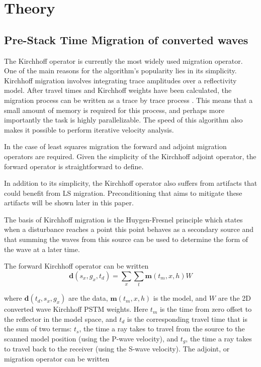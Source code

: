 \section{Theory}

\subsection{Pre-Stack Time Migration of converted waves}

The Kirchhoff operator is currently the most widely used migration operator. One of the main reasons for the algorithm's popularity lies in its simplicity. Kirchhoff migration involves integrating trace amplitudes over a reflectivity model. After travel times and Kirchhoff weights have been calculated, the migration process can be written as a trace by trace process \citep{sep80}. This means that a small amount of memory is required for this process, and perhaps more importantly the task is highly parallelizable. The speed of this algorithm also makes it possible to perform iterative velocity analysis.

In the case of least squares migration the forward and adjoint migration operators are required. Given the simplicity of the Kirchhoff adjoint operator, the forward operator is straightforward to define. 

In addition to its simplicity, the Kirchhoff operator also suffers from artifacts that could benefit from LS migration. Preconditioning that aims to mitigate these artifacts will be shown later in this paper.

The basis of Kirchhoff migration is the Huygen-Fresnel principle which states when a disturbance reaches a point this point behaves as a secondary source and that summing the waves from this source can be used to determine the form of the wave at a later time.

The forward Kirchhoff operator can be written
\begin{equation}
\mathbf{d}(s_x,g_x,t_d)=\sum\limits_{x}\sum\limits_{t}\mathbf{m}(t_m,x,h)W
\end{equation}

where $\mathbf{d}(t_d,s_x,g_x)$ are the data, $\mathbf{m}(t_m,x,h)$ is the model, and $W$ are the 2D converted wave Kirchhoff PSTM weights. Here $t_m$ is the time from zero offset to the reflector in the model space, and $t_d$ is the corresponding travel time that is the sum of two terms: $t_s$, the time a ray takes to travel from the source to the scanned model position (using the P-wave velocity), and $t_g$, the time a ray takes to travel back to the receiver (using the S-wave velocity). The adjoint, or migration operator can be written

